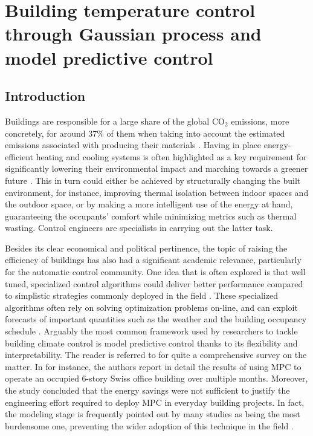 \cleardoublepage
\chapter{Building temperature control through Gaussian process and model predictive control}

\section{Introduction}

Buildings are responsible for a large share of the global CO$_2$ emissions, more concretely, for around 37\% of them when taking into account the estimated emissions associated with producing their materials \citep[§3.2]{united2022}. Having in place energy-efficient heating and cooling systems is often highlighted as a key requirement for significantly lowering their environmental impact and marching towards a greener future \citep{iea2022}. This in turn could either be achieved by structurally changing the built environment, for instance, improving thermal isolation between indoor spaces and the outdoor space, or by making a more intelligent use of the energy at hand, guaranteeing the occupants' comfort while minimizing metrics such as thermal wasting. Control engineers are specialists in carrying out the latter task.

Besides its clear economical and political pertinence, the topic of raising the efficiency of buildings has also had a significant academic relevance, particularly for the automatic control community. One idea that is often explored is that well tuned, specialized control algorithms could deliver better performance compared to simplistic strategies commonly deployed in the field \citep{stluka2018architectures}. These specialized algorithms often rely on solving optimization problems on-line, and can exploit forecasts of important quantities such as the weather and the building occupancy schedule \citep{oldewurtel2012use}. Arguably the most common framework used by researchers to tackle building climate control is model predictive control thanks to its flexibility and interpretability. The reader is referred to \cite{drgovna2020all} for quite a comprehensive survey on the matter. In \cite{sturzenegger2015model} for instance, the authors report in detail the results of using MPC to operate an occupied 6-story Swiss office building over multiple months. Moreover, the study concluded that the energy savings were not sufficient to justify the engineering effort required to deploy MPC in everyday building projects. In fact, the modeling stage is frequently pointed out by many studies as being the most burdensome one, preventing the wider adoption of this technique in the field \citep{drgovna2020all,bunning2020experimental}.

